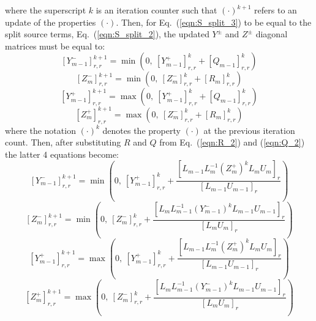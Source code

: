 \documentclass{warpdoc}
\begin{document}
%
where the superscript $k$ is an iteration counter such that $(\cdot)^{k+1}$ refers to an update of the properties $(\cdot)$. Then, for Eq.\ (\ref{eqn:S_split_3}) to be equal to the split source terms, Eq.\ (\ref{eqn:S_split_2}), the  updated $Y^\pm$ and $Z^\pm$ diagonal matrices must be equal to: 
%
\begin{equation}
\left[ Y^-_{m-1}\right]^{k+1}_{r,r} = \min \left(0,~\left[Y^+_{m-1}\right]^k_{r,r}+\left[Q_{m-1}\right]^k_{r,r}  \right) 
\label{eqn:Yminus2}
\end{equation}
%
%
\begin{equation}
\left[ Z^-_{m}\right]^{k+1}_{r,r} = \min \left(0,~\left[Z^-_{m}\right]^k_{r,r}+\left[R_{m}\right]^k_{r,r}  \right) 
\label{eqn:Zminus2}
\end{equation}
%
%
\begin{equation}
\left[ Y^+_{m-1}\right]^{k+1}_{r,r} = \max \left(0,~\left[Y^+_{m-1}\right]^k_{r,r}+\left[Q_{m-1}\right]^k_{r,r}  \right) 
\label{eqn:Yplus2}
\end{equation}
%
%
\begin{equation}
\left[ Z^+_{m}\right]^{k+1}_{r,r} = \max \left(0,~\left[Z^-_{m}\right]^k_{r,r}+\left[R_{m}\right]^k_{r,r}  \right) 
\label{eqn:Zplus2}
\end{equation}
%
where the notation  $(\cdot)^k$ denotes the property $(\cdot)$ at the previous iteration count. Then, after substituting $R$ and $Q$ from Eq.\ (\ref{eqn:R_2}) and (\ref{eqn:Q_2}) the latter 4 equations become:
%
\begin{equation}
\left[ Y^-_{m-1}\right]^{k+1}_{r,r} = \min \left(0,~\left[Y^+_{m-1}\right]^k_{r,r}+\frac{\left[L_{m-1} L^{-1}_{m} (Z^+_{m})^k L_{m} U_{m}\right]_r}{\left[L_{m-1} U_{m-1}\right]_r}  \right) 
\label{eqn:Yminus3}
\end{equation}
%
%
\begin{equation}
\left[ Z^-_{m}\right]^{k+1}_{r,r} = \min \left(0,~\left[Z^-_{m}\right]^k_{r,r}+\frac{\left[L_{m} L^{-1}_{m-1} (Y^-_{m-1})^k L_{m-1} U_{m-1}\right]_r}{\left[L_{m} U_{m}\right]_r}  \right) 
\label{eqn:Zminus3}
\end{equation}
%
%
\begin{equation}
\left[ Y^+_{m-1}\right]^{k+1}_{r,r} = \max \left(0,~\left[Y^+_{m-1}\right]^k_{r,r}+\frac{\left[L_{m-1} L^{-1}_{m} (Z^+_{m})^k L_{m} U_{m}\right]_r}{\left[L_{m-1} U_{m-1}\right]_r}  \right) 
\label{eqn:Yplus3}
\end{equation}
%
%
\begin{equation}
\left[ Z^+_{m}\right]^{k+1}_{r,r} = \max \left(0,~\left[Z^-_{m}\right]^k_{r,r}+\frac{\left[L_{m} L^{-1}_{m-1} (Y^-_{m-1})^k L_{m-1} U_{m-1}\right]_r}{\left[L_{m} U_{m}\right]_r}  \right) 
\label{eqn:Zplus3}
\end{equation}
\end{document}
